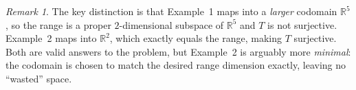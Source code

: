\documentclass[12pt]{article}
\theoremstyle{definition}
\theoremstyle{remark}
\newtheorem*{remark}{Remark}
\newcommand{\R}{\mathbb{R}}
\begin{document}
\begin{remark}
The key distinction is that Example~1 maps into a \emph{larger} codomain
$\R^5$, so the range is a proper $2$-dimensional subspace of $\R^5$ and $T$ is
not surjective.  Example~2 maps into $\R^2$, which exactly equals the range,
making $T$ surjective. Both are valid answers to the problem, but
Example~2 is arguably more \emph{minimal}: the codomain is chosen to match the
desired range dimension exactly, leaving no ``wasted'' space.
\end{remark}
 
\end{document}
